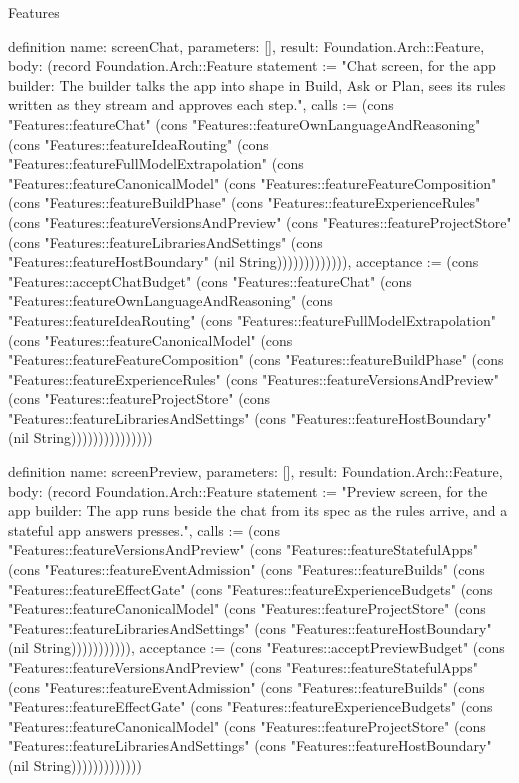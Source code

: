\begin{lexlean}{Features}
\begin{semanticmodule}
definition{
  name: screenChat,
  parameters: [],
  result: Foundation.Arch::Feature,
  body: (record Foundation.Arch::Feature {statement := "Chat screen, for the app builder: The builder talks the app into shape in Build, Ask or Plan, sees its rules written as they stream and approves each step.", calls := (cons "Features::featureChat" (cons "Features::featureOwnLanguageAndReasoning" (cons "Features::featureIdeaRouting" (cons "Features::featureFullModelExtrapolation" (cons "Features::featureCanonicalModel" (cons "Features::featureFeatureComposition" (cons "Features::featureBuildPhase" (cons "Features::featureExperienceRules" (cons "Features::featureVersionsAndPreview" (cons "Features::featureProjectStore" (cons "Features::featureLibrariesAndSettings" (cons "Features::featureHostBoundary" (nil String))))))))))))), acceptance := (cons "Features::acceptChatBudget" (cons "Features::featureChat" (cons "Features::featureOwnLanguageAndReasoning" (cons "Features::featureIdeaRouting" (cons "Features::featureFullModelExtrapolation" (cons "Features::featureCanonicalModel" (cons "Features::featureFeatureComposition" (cons "Features::featureBuildPhase" (cons "Features::featureExperienceRules" (cons "Features::featureVersionsAndPreview" (cons "Features::featureProjectStore" (cons "Features::featureLibrariesAndSettings" (cons "Features::featureHostBoundary" (nil String))))))))))))))})
}

definition{
  name: screenPreview,
  parameters: [],
  result: Foundation.Arch::Feature,
  body: (record Foundation.Arch::Feature {statement := "Preview screen, for the app builder: The app runs beside the chat from its spec as the rules arrive, and a stateful app answers presses.", calls := (cons "Features::featureVersionsAndPreview" (cons "Features::featureStatefulApps" (cons "Features::featureEventAdmission" (cons "Features::featureBuilds" (cons "Features::featureEffectGate" (cons "Features::featureExperienceBudgets" (cons "Features::featureCanonicalModel" (cons "Features::featureProjectStore" (cons "Features::featureLibrariesAndSettings" (cons "Features::featureHostBoundary" (nil String))))))))))), acceptance := (cons "Features::acceptPreviewBudget" (cons "Features::featureVersionsAndPreview" (cons "Features::featureStatefulApps" (cons "Features::featureEventAdmission" (cons "Features::featureBuilds" (cons "Features::featureEffectGate" (cons "Features::featureExperienceBudgets" (cons "Features::featureCanonicalModel" (cons "Features::featureProjectStore" (cons "Features::featureLibrariesAndSettings" (cons "Features::featureHostBoundary" (nil String))))))))))))})
}


\end{semanticmodule}
\end{lexlean}
